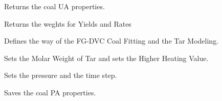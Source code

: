 \documentclass[letterpaper,10pt,english]{sphinxmanual}
\begin{document}
\begin{fulllineitems}
\begin{fulllineitems}
\end{fulllineitems}


\begin{fulllineitems}
\label{GUI:GUI.InfosFromGUI.UA}
Returns the coal UA properties.

\end{fulllineitems}


\begin{fulllineitems}
\label{GUI:GUI.InfosFromGUI.WeightYR}
Returns the weghts for Yields and Rates

\end{fulllineitems}


\begin{fulllineitems}
\label{GUI:GUI.InfosFromGUI.setFGCoalProp}
Defines the way of the FG-DVC Coal Fitting and the Tar Modeling.

\end{fulllineitems}


\begin{fulllineitems}
\label{GUI:GUI.InfosFromGUI.setMwsHHV}
Sets the Molar Weight of Tar and sets the Higher Heating Value.

\end{fulllineitems}


\begin{fulllineitems}
\label{GUI:GUI.InfosFromGUI.setOperCond}
Sets the pressure and the time step.

\end{fulllineitems}


\begin{fulllineitems}
\label{GUI:GUI.InfosFromGUI.setPA}
Saves the coal PA properties.


\end{fulllineitems}
\end{fulllineitems}
\end{document}
